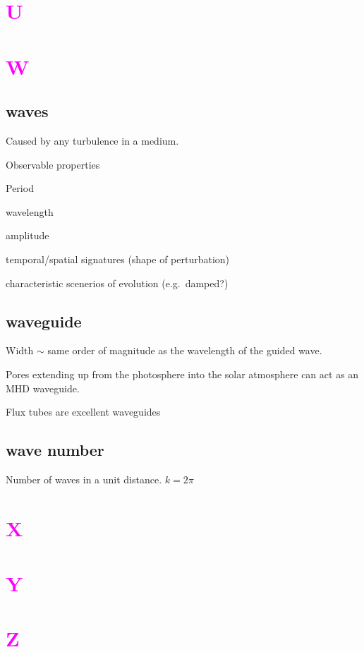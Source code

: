 \documentclass[12pt]{article}
\begin{document}
\section*{\textcolor{magenta}{U}}
\section*{\textcolor{magenta}{W}}

\subsection*{waves}
\begin{itemize*}
    \item Caused by any turbulence in a medium.
    \item Observable properties
        \begin{itemize*}
            \item Period
            \item wavelength
            \item amplitude
            \item temporal/spatial signatures (shape of perturbation)
            \item characteristic scenerios of evolution (e.g.\ damped?)
        \end{itemize*}
\end{itemize*}

\subsection*{waveguide}
\begin{itemize*}
    \item Width $\sim$ same order of magnitude as the wavelength of
        the guided wave.
    \item Pores extending up from the photosphere
        into the solar atmosphere can act as an
        MHD waveguide.
    \item Flux tubes are excellent waveguides
\end{itemize*}

\subsection*{wave number}
Number of waves in a unit distance.
$ k = 2\pi $

\section*{\textcolor{magenta}{X}}
\section*{\textcolor{magenta}{Y}}
\section*{\textcolor{magenta}{Z}}
\end{document}
